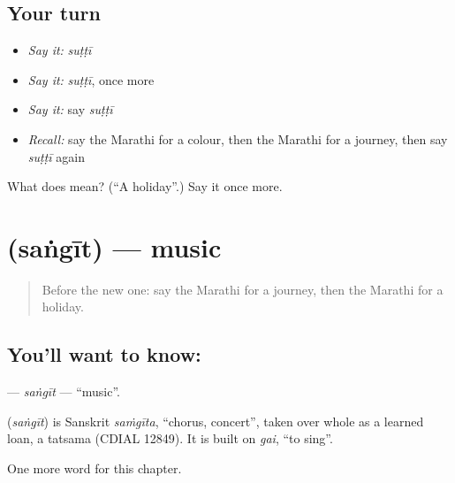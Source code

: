 \subsection*{Your turn}
\begin{itemize}
\raggedright
  \item \emph{Say it:} \emph{suṭṭī}
  \item \emph{Say it:} \emph{suṭṭī}, once more
  \item \emph{Say it:} say \emph{suṭṭī}
  \item \emph{Recall:} say the Marathi for a colour, then the Marathi for a journey, then say \emph{suṭṭī} again
\end{itemize}

\begin{tcolorbox}[breakable,colback=teal!4,colframe=teal!35!black,title={Before you move on}]
What does  mean? (\textquotedblleft{}A holiday\textquotedblright{}.) Say it once more.
\end{tcolorbox}
\section[\texorpdfstring{\mr{संगीत} (saṅgīt)}{संगीत (saṅgīt)}]{ (saṅgīt) — music}

\label{lesson:MR-C120-sangit}



\begin{quote}
Before the new one: say the Marathi for a journey, then the Marathi for a holiday.
\end{quote}

\subsection*{You'll want to know: }
\textbf{} — \emph{saṅgīt} — \textquotedblleft{}music\textquotedblright{}.

\begin{cousinweb}
\textbf{} (\emph{saṅgīt}) is Sanskrit \emph{saṁgīta}, \textquotedblleft{}chorus, concert\textquotedblright{}, taken over whole as a learned loan, a tatsama (CDIAL 12849). It is built on \emph{gai}, \textquotedblleft{}to sing\textquotedblright{}.
\end{cousinweb}

\begin{grammarlens}[title={What you've built}]
One more word for this chapter.
\end{grammarlens}

